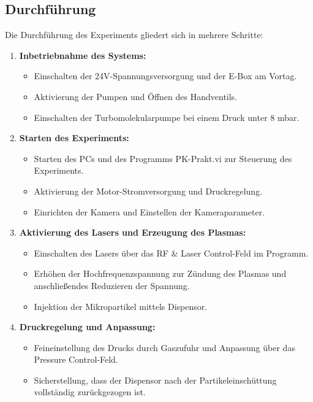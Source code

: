 \documentclass[12pt,a4paper,ngerman]{article}
\begin{document}
\newpage
\subsection{Durchführung}
Die Durchführung des Experiments gliedert sich in mehrere Schritte:

\begin{enumerate}
    \item \textbf{Inbetriebnahme des Systems:}
    \begin{itemize}
        \item Einschalten der 24V-Spannungsversorgung und der E-Box am Vortag.
        \item Aktivierung der Pumpen und Öffnen des Handventils.
        \item Einschalten der Turbomolekularpumpe bei einem Druck unter 8 mbar.
    \end{itemize}
    \item \textbf{Starten des Experiments:}
    \begin{itemize}
        \item Starten des PCs und des Programms \glqq{}PK-Prakt.vi\grqq{} zur Steuerung des Experiments.
        \item Aktivierung der Motor-Stromversorgung und Druckregelung.
        \item Einrichten der Kamera und Einstellen der Kameraparameter.
    \end{itemize}
    \item \textbf{Aktivierung des Lasers und Erzeugung des Plasmas:}
    \begin{itemize}
        \item Einschalten des Lasers über das \glqq{}RF \& Laser Control\grqq{}-Feld im Programm.
        \item Erhöhen der Hochfrequenzspannung zur Zündung des Plasmas und anschließendes Reduzieren der Spannung.
        \item Injektion der Mikropartikel mittels Dispensor.
    \end{itemize}
    \item \textbf{Druckregelung und Anpassung:}
    \begin{itemize}
        \item Feineinstellung des Drucks durch Gaszufuhr und Anpassung über das \glqq{}Pressure Control\grqq{}-Feld.
        \item Sicherstellung, dass der Dispensor nach der Partikeleinschüttung vollständig zurückgezogen ist.
    \end{itemize}
\end{enumerate}
\end{document}
